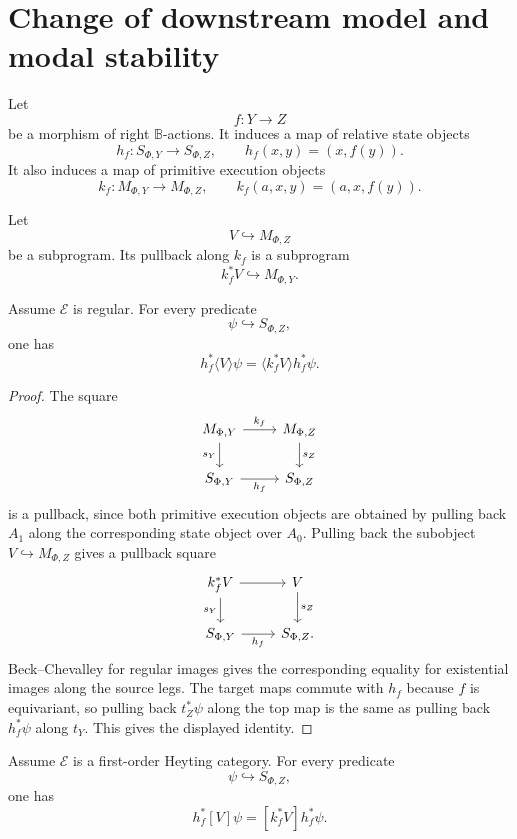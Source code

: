 \section{Change of downstream model and modal stability}
\label{sec:downstream-change-modal-stability}

Let
\[
f:Y\to Z
\]
be a morphism of right \(\mathbb B\)-actions. It induces a map of relative
state objects
\[
h_f:S_{\Phi,Y}\to S_{\Phi,Z},
\qquad
h_f(x,y)=(x,f(y)).
\]
It also induces a map of primitive execution objects
\[
k_f:M_{\Phi,Y}\to M_{\Phi,Z},
\qquad
k_f(a,x,y)=(a,x,f(y)).
\]

Let
\[
V\hookrightarrow M_{\Phi,Z}
\]
be a subprogram. Its pullback along \(k_f\) is a subprogram
\[
k_f^\ast V\hookrightarrow M_{\Phi,Y}.
\]

\begin{proposition}
\label{prop:diamond-stability-downstream-change}
Assume \(\mathcal E\) is regular. For every predicate
\[
\psi\hookrightarrow S_{\Phi,Z},
\]
one has
\[
h_f^\ast\langle V\rangle\psi
=
\langle k_f^\ast V\rangle h_f^\ast\psi.
\]
\end{proposition}

\begin{proof}
The square
\[
\begin{tikzcd}
M_{\Phi,Y} \arrow[r,"k_f"] \arrow[d,"s_Y"']
&
M_{\Phi,Z} \arrow[d,"s_Z"]
\\
S_{\Phi,Y} \arrow[r,"h_f"']
&
S_{\Phi,Z}
\end{tikzcd}
\]
is a pullback, since both primitive execution objects are obtained by pulling
back \(A_1\) along the corresponding state object over \(A_0\). Pulling back
the subobject \(V\hookrightarrow M_{\Phi,Z}\) gives a pullback square
\[
\begin{tikzcd}
k_f^\ast V \arrow[r] \arrow[d,"s_Y"']
&
V \arrow[d,"s_Z"]
\\
S_{\Phi,Y} \arrow[r,"h_f"']
&
S_{\Phi,Z}.
\end{tikzcd}
\]
Beck--Chevalley for regular images gives the corresponding equality for
existential images along the source legs. The target maps commute with
\(h_f\) because \(f\) is equivariant, so pulling back \(t_Z^\ast\psi\) along
the top map is the same as pulling back \(h_f^\ast\psi\) along \(t_Y\). This
gives the displayed identity.
\end{proof}

\begin{proposition}
\label{prop:box-stability-downstream-change}
Assume \(\mathcal E\) is a first-order Heyting category. For every predicate
\[
\psi\hookrightarrow S_{\Phi,Z},
\]
one has
\[
h_f^\ast[V]\psi
=
[k_f^\ast V]h_f^\ast\psi.
\]
\end{proposition}

